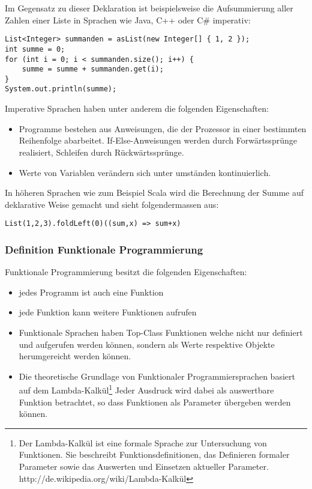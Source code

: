 Im Gegensatz zu dieser Deklaration ist beispielsweise die Aufsummierung aller Zahlen einer Liste in Sprachen wie Java, C++ oder C\# imperativ:

\begin{lstlisting}[caption=Summe einer Liste in Java]
List<Integer> summanden = asList(new Integer[] { 1, 2 });
int summe = 0;
for (int i = 0; i < summanden.size(); i++) {
	summe = summe + summanden.get(i);
}
System.out.println(summe);
\end{lstlisting}

Imperative Sprachen haben unter anderem die folgenden Eigenschaften:
\begin{itemize}
\item Programme bestehen aus Anweisungen, die der Prozessor in einer bestimmten Reihenfolge abarbeitet. If-Else-Anweisungen werden durch Forw\"artsspr\"unge realisiert, Schleifen durch R\"uckw\"artsspr\"unge.
\item Werte von Variablen ver\"andern sich unter umst\"anden kontinuierlich.
\end{itemize}

In h\"oheren Sprachen wie zum Beispiel Scala wird die Berechnung der Summe auf deklarative Weise gemacht und sieht folgendermassen aus:
\begin{lstlisting}[caption=Summe einer Liste in Scala]
List(1,2,3).foldLeft(0)((sum,x) => sum+x)
\end{lstlisting} 

\subsubsection{Definition Funktionale Programmierung}
Funktionale Programmierung besitzt die folgenden Eigenschaften:
\begin{itemize}
\item jedes Programm ist auch eine Funktion
\item jede Funktion kann weitere Funktionen aufrufen
\item Funktionale Sprachen haben Top-Class Funktionen welche nicht nur definiert und aufgerufen werden k\"onnen, sondern als Werte respektive Objekte herumgereicht werden k\"onnen.
\item Die theoretische Grundlage von Funktionaler Programmiersprachen basiert auf dem Lambda-Kalk\"ul\footnote{Der Lambda-Kalk\"ul ist eine formale Sprache zur Untersuchung von Funktionen. Sie beschreibt Funktionsdefinitionen, das Definieren formaler Parameter sowie das Auswerten und Einsetzen aktueller Parameter. http://de.wikipedia.org/wiki/Lambda-Kalk\"ul} Jeder Ausdruck wird dabei als auswertbare Funktion betrachtet, so dass Funktionen als Parameter \"ubergeben werden k\"onnen.
\end{itemize}





